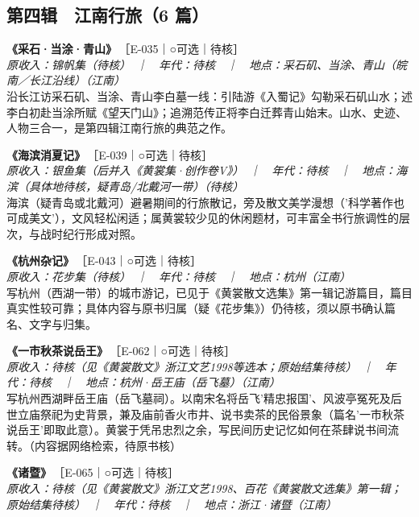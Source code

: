 \documentclass[UTF8,fontset=none,zihao=-4,a4paper]{ctexart}
\begin{document}
\subsection{第四辑　江南行旅（6 篇）}
\noindent\textbf{《采石·当涂·青山》}\,{\small ［E-035｜○可选｜待核］}\\
{\small\itshape 原收入：锦帆集（待核）　｜　年代：待核　｜　地点：采石矶、当涂、青山（皖南／长江沿线）（江南）}\\
沿长江访采石矶、当涂、青山李白墓一线：引陆游《入蜀记》勾勒采石矶山水；述李白初赴当涂所赋《望天门山》；追溯范传正将李白迁葬青山始末。山水、史迹、人物三合一，是第四辑江南行旅的典范之作。
\par\vspace{5pt}
\noindent\textbf{《海滨消夏记》}\,{\small ［E-039｜○可选｜待核］}\\
{\small\itshape 原收入：银鱼集（后并入《黄裳集·创作卷V》）　｜　年代：待核　｜　地点：海滨（具体地待核，疑青岛/北戴河一带）（待核）}\\
海滨（疑青岛或北戴河）避暑期间的行旅散记，旁及散文美学漫想（'科学著作也可成美文'），文风轻松闲适；属黄裳较少见的休闲题材，可丰富全书行旅调性的层次，与战时纪行形成对照。
\par\vspace{5pt}
\noindent\textbf{《杭州杂记》}\,{\small ［E-043｜○可选｜待核］}\\
{\small\itshape 原收入：花步集（待核）　｜　年代：待核　｜　地点：杭州（江南）}\\
写杭州（西湖一带）的城市游记，已见于《黄裳散文选集》第一辑记游篇目，篇目真实性较可靠；具体内容与原书归属（疑《花步集》）仍待核，须以原书确认篇名、文字与归集。
\par\vspace{5pt}
\noindent\textbf{《一市秋茶说岳王》}\,{\small ［E-062｜○可选｜待核］}\\
{\small\itshape 原收入：待核（见《黄裳散文》浙江文艺1998等选本；原始结集待核）　｜　年代：待核　｜　地点：杭州·岳王庙（岳飞墓）（江南）}\\
写杭州西湖畔岳王庙（岳飞墓祠）。以南宋名将岳飞'精忠报国'、风波亭冤死及后世立庙祭祀为史背景，兼及庙前香火市井、说书卖茶的民俗景象（篇名'一市秋茶说岳王'即取此意）。黄裳于凭吊忠烈之余，写民间历史记忆如何在茶肆说书间流转。（内容据网络检索，待原书核）
\par\vspace{5pt}
\noindent\textbf{《诸暨》}\,{\small ［E-065｜○可选｜待核］}\\
{\small\itshape 原收入：待核（见《黄裳散文》浙江文艺1998、百花《黄裳散文选集》第一辑；原始结集待核）　｜　年代：待核　｜　地点：浙江·诸暨（江南）}\\
\end{document}
